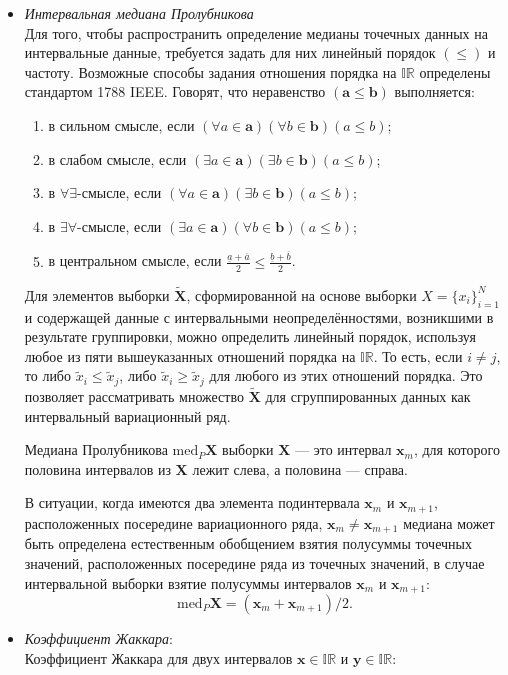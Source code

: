 \documentclass[10pt]{article}
\begin{document}
\begin{itemize}
 \item \textit{Интервальная медиана Пролубникова}\\

Для того, чтобы распространить определение медианы точечных данных на интервальные данные, требуется задать для них линейный порядок \( (\leq) \) и частоту. Возможные способы задания отношения порядка на \( \mathbb{IR} \) определены стандартом 1788 IEEE. Говорят, что неравенство \( (\mathbf{a} \leq \mathbf{b}) \) выполняется:

\begin{enumerate}
    \item в сильном смысле, если \( (\forall a \in \mathbf{a})(\forall b \in \mathbf{b})(a \leq b) \);
    \item в слабом смысле, если \( (\exists a \in \mathbf{a})(\exists b \in \mathbf{b})(a \leq b) \);
    \item в \( \forall \exists \)-смысле, если \( (\forall a \in \mathbf{a})(\exists b \in \mathbf{b})(a \leq b) \);
    \item в \( \exists \forall \)-смысле, если \( (\exists a \in \mathbf{a})(\forall b \in \mathbf{b})(a \leq b) \);
    \item в центральном смысле, если \( \frac{\underline{a} + \overline{a}}{2} \leq \frac{\underline{b} + \overline{b}}{2} \).
\end{enumerate}

  Для элементов выборки \( \mathbf{\tilde{X}} \), сформированной на основе выборки \( X = \{ x_i \}_{i=1}^{N} \) и содержащей данные с интервальными неопределённостями, возникшими в результате группировки, можно определить линейный порядок, используя любое из пяти вышеуказанных отношений порядка на \( \mathbb{IR} \). То есть, если \( i \neq j \), то либо \( \tilde{x}_i \leq \tilde{x}_j \), либо \( \tilde{x}_i \geq \tilde{x}_j \) для любого из этих отношений порядка. Это позволяет рассматривать множество \( \mathbf{\tilde{X}} \) для сгруппированных данных как интервальный вариационный ряд.

  Медиана Пролубникова \( \text{med}_P \mathbf{X} \) выборки
  \( \mathbf{X} \) --- это интервал \( \mathbf{x}_m \), для которого
  половина интервалов из \( \mathbf{X} \) лежит слева, а половина
  --- справа.

  В ситуации, когда имеются два элемента подинтервала \( \mathbf{x}_m \)
  и \( \mathbf{x}_{m+1} \), расположенных посередине вариационного ряда,
  \( \mathbf{x}_m \ne \mathbf{x}_{m+1} \) медиана может быть определена
  естественным обобщением взятия полусуммы точечных значений,
  расположенных посередине ряда из точечных значений, в случае
  интервальной выборки взятие полусуммы интервалов \( \mathbf{x}_m \)
  и \( \mathbf{x}_{m+1} \):
    \begin{equation*}
    \text{med}_P \mathbf{X} = (\mathbf{x}_m + \mathbf{x}_{m+1}) / 2.
  \end{equation*}
\item \textit{Коэффициент Жаккара}:\\
 Коэффициент Жаккара для двух интервалов \( \mathbf{x} \in \mathbb{IR} \)
  и \( \mathbf{y} \in \mathbb{IR} \):


\end{itemize}
\end{document}

